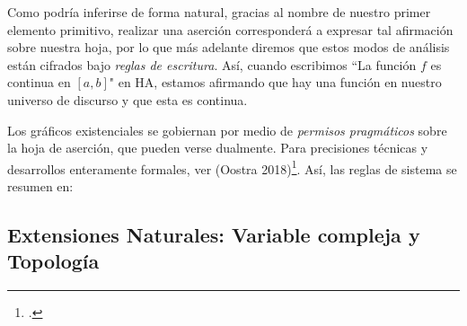 \documentclass[
	fontsize=10pt, %
	twoside=true, %
	secnumdepth=1, %
	abstract=true, %
]{kaohandt}
\begin{document}
Como podría inferirse de forma natural, gracias al nombre de nuestro primer elemento primitivo, realizar una aserción corresponderá a expresar tal afirmación sobre nuestra hoja, por lo que más adelante diremos que estos modos de análisis están cifrados bajo \textit{reglas de escritura}. Así, cuando escribimos ``La función $f$ es continua en $[a,b]$" en HA, estamos afirmando que hay una función en nuestro universo de discurso y que esta es continua.


\begin{marginfigure}[h!]
\begin{center}  





\end{center}    
\end{marginfigure}

Los gráficos existenciales se gobiernan por medio de \emph{permisos pragmáticos} sobre la hoja de aserción, que pueden verse dualmente. Para precisiones técnicas y desarrollos enteramente formales, ver (Oostra 2018)\footnote[5]{\cite{OostraLibro}.}. Así, las  reglas de sistema se resumen en:


\subsection{Extensiones Naturales: Variable compleja y Topología}

\end{document}
